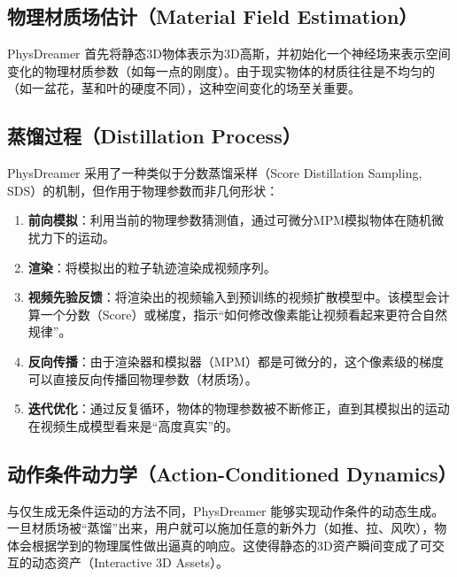 \subsection{物理材质场估计（Material Field Estimation）}
PhysDreamer 首先将静态3D物体表示为3D高斯，并初始化一个神经场来表示空间变化的物理材质参数（如每一点的刚度）\cite{li2024physdreamer_arxiv,li2024physdreamer_eccv}。由于现实物体的材质往往是不均匀的（如一盆花，茎和叶的硬度不同），这种空间变化的场至关重要。

\subsection{蒸馏过程（Distillation Process）}
PhysDreamer 采用了一种类似于分数蒸馏采样（Score Distillation Sampling, SDS）的机制，但作用于物理参数而非几何形状\cite{wang2024dreamphysics_arxiv}：
\begin{enumerate}
    \item \textbf{前向模拟}：利用当前的物理参数猜测值，通过可微分MPM模拟物体在随机微扰力下的运动。
    \item \textbf{渲染}：将模拟出的粒子轨迹渲染成视频序列。
    \item \textbf{视频先验反馈}：将渲染出的视频输入到预训练的视频扩散模型中。该模型会计算一个分数（Score）或梯度，指示“如何修改像素能让视频看起来更符合自然规律”\cite{li2024physdreamer_arxiv2}。
    \item \textbf{反向传播}：由于渲染器和模拟器（MPM）都是可微分的，这个像素级的梯度可以直接反向传播回物理参数（材质场）。
    \item \textbf{迭代优化}：通过反复循环，物体的物理参数被不断修正，直到其模拟出的运动在视频生成模型看来是“高度真实”的。
\end{enumerate}

\subsection{动作条件动力学（Action-Conditioned Dynamics）}
与仅生成无条件运动的方法不同，PhysDreamer 能够实现动作条件的动态生成。一旦材质场被“蒸馏”出来，用户就可以施加任意的新外力（如推、拉、风吹），物体会根据学到的物理属性做出逼真的响应\cite{li2024physdreamer_arxiv,li2024physdreamer_eccv}。这使得静态的3D资产瞬间变成了可交互的动态资产（Interactive 3D Assets）。
